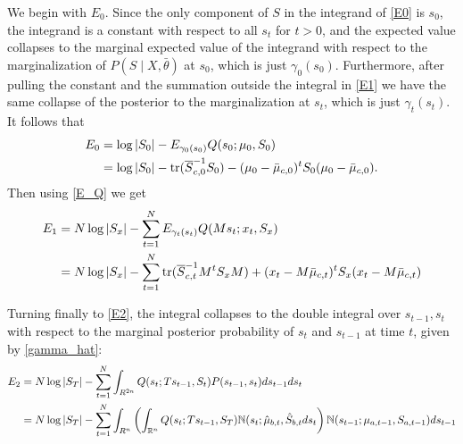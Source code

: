 \documentclass[12pt,leqno]{article}
\begin{document}
We begin with $E_0$. Since the only component of $S$ in the integrand of \eqref{E0} is $s_0$, the integrand is a constant
with respect to all $s_t$ for $t > 0$, and the expected value
collapses to the marginal 
expected value of the integrand with respect to the marginalization of $P(S\mid X,\bar{\theta})$ at $s_0$, which is just 
$\gamma_0(s_0)$.  Furthermore, after pulling the constant and the summation 
outside the integral in \eqref{E1} we have the same collapse of the posterior to the marginalization at $s_t$,
which is just $\gamma_t(s_t)$.  It follows that
\begin{equation}  \label{E0:1}
  \begin{split}
  E_0 &= \log|S_0| - E_{\gamma_0(s_0)}Q(s_0;\mu_0,S_0)\\
  &=\log|S_0| - \text{\rm tr}(\overline{S}_{c,0}^{-1}S_0) - (\mu_0-\bar{\mu}_{c,0})^tS_0(\mu_0 - \bar{\mu}_{c,0}).
  \end{split}
  \end{equation}
Then using \eqref{E_Q} we get
\begin{equation}\label{E1:1}
  \begin{split}
  E_1 &= N\log|S_x| - \sum_{t=1}^NE_{\gamma_t(s_t)}Q(Ms_t;x_t,S_x)\\
  &= N\log|S_x| - \sum_{t=1}^N\text{\rm tr}(\overline{S}_{c,t}^{-1}M^tS_xM) + (x_t-M\bar{\mu}_{c,t})^tS_x(x_t-M\bar{\mu}_{c,t})
  \end{split}
\end{equation}


Turning finally to  \eqref{E2}, the integral collapses to the double integral over $s_{t-1},s_t$ with respect to the
marginal posterior probability of $s_t$ and $s_{t-1}$ at time $t$, given by \eqref{gamma_hat}:
\begin{equation}\label{E2:1}
  \begin{split}
    E_2 &= N\log|S_T| - \sum_{t=1}^N\int_{R^{2n}}Q(s_t;Ts_{t-1},S_t)P(s_{t-1},s_t)ds_{t-1}ds_t\\
        &= N\log|S_T| - \sum_{t=1}^N\int_{R^n}\left(\int_{{\mathbb R}^{n}}Q(s_t;Ts_{t-1},S_T){\mathbb N}(s_t;\hat{\mu}_{b,t},\hat{S}_{b,t}
          ds_t\right){\mathbb N}(s_{t-1};\mu_{a,t-1},S_{a,t-1})ds_{t-1}\\
  \end{split}
  \end{equation}
\end{document}

